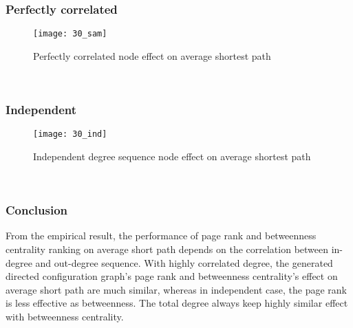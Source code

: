 \documentclass[10pt,english]{article}\usepackage{graphicx, color}
\numberwithin{equation}{section}
\numberwithin{figure}{section}
\begin{document}
\subsubsection{Perfectly correlated}

\begin{figure}[htbp]
\centering\texttt{[image: 30\_sam]}
\caption{Perfectly correlated node effect on average shortest path}
\end{figure}
\quad\\


\subsubsection{Independent}
\begin{figure}[htbp]
\centering\texttt{[image: 30\_ind]}
\caption{Independent degree sequence node effect on average shortest path}
\end{figure}
\quad\\



\subsubsection{Conclusion}
From the empirical result, the performance of page rank and betweenness centrality ranking on average short path depends on the correlation between in-degree and out-degree sequence. With highly correlated degree, the generated directed configuration graph's page rank and betweenness centrality's effect on average short path are much similar, whereas in independent case, the page rank is less effective as betweenness. The total degree always keep highly similar effect with betweenness centrality.
\end{document}
